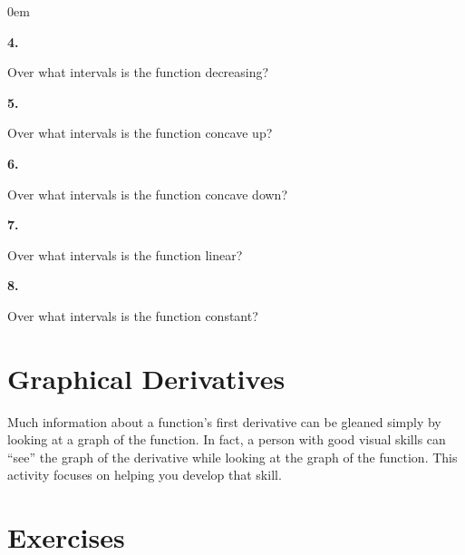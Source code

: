 \documentclass[12pt,]{book}
\theoremstyle{plain}
\theoremstyle{definition}
\numberwithin{equation}{section}
\newenvironment{exercisegroup}%
{\medskip\noindent}%
{\par\bigskip}%
\newlength{\exercisegroupindent}%
\newlength{\exercisegroupitemwidth}%
\newenvironment{exercisegrouplist}%
{\vspace{-\partopsep}%
\begin{adjustwidth}{\exercisegroupindent}{0em}}%
{\end{adjustwidth}%
\vspace{-\partopsep}%
\vspace{\baselineskip}}%
\newenvironment{exercisegroupbycol}[1]%
{\begin{exercisegrouplist}%
\vspace{-\multicolsep}%
\begin{multicols}{#1}%
\setlength{\parindent}{0em}%
\setlength{\exercisegroupitemwidth}{\linewidth}}%
{\end{multicols}%
\vspace{-\multicolsep}%
\end{exercisegrouplist}}%
\newenvironment{exercisegroupitem}[1]%
{\begin{minipage}[t]{\exercisegroupitemwidth}
\vspace{0pt}%
{\bfseries#1}%
\rule{0pt}{\baselineskip}}{\strut%
\end{minipage}%
\hspace{\columnsep}}%
\providecommand\phantomsection{}
\begin{document}
\begin{exercisegroup}
\begin{exercisegroupbycol}{1}
\par%
\begin{exercisegroupitem}{4. }\phantomsection\hypertarget{exercise-205}{\null}
Over what intervals is the function decreasing?%
\end{exercisegroupitem}%
\par%
\begin{exercisegroupitem}{5. }\phantomsection\hypertarget{exercise-206}{\null}
Over what intervals is the function concave up?%
\end{exercisegroupitem}%
\par%
\begin{exercisegroupitem}{6. }\phantomsection\hypertarget{exercise-207}{\null}
Over what intervals is the function concave down?%
\end{exercisegroupitem}%
\par%
\begin{exercisegroupitem}{7. }\phantomsection\hypertarget{exercise-208}{\null}
Over what intervals is the function linear?%
\end{exercisegroupitem}%
\par%
\begin{exercisegroupitem}{8. }\phantomsection\hypertarget{exercise-209}{\null}
Over what intervals is the function constant?%
\end{exercisegroupitem}%
\par%
\end{exercisegroupbycol}%
\end{exercisegroup}%
\typeout{************************************************}
\typeout{************************************************}
\section[Graphical Derivatives]{Graphical Derivatives}\label{section-graphical-derivatives}
Much information about a function's first derivative can be gleaned simply by looking at a graph of the function. In fact, a person with good visual skills can ``see'' the graph of the derivative while looking at the graph of the function. This activity focuses on helping you develop that skill.%
\typeout{************************************************}
\typeout{************************************************}
\section*{Exercises}\label{exercises-24}
\end{document}
